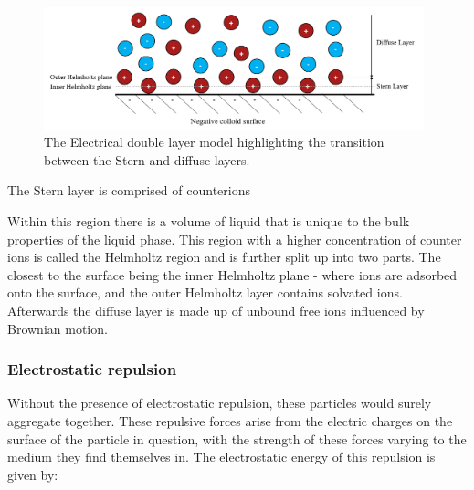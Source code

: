 
\begin{figure}[h]     %
        \begin{center}
          \includegraphics[width=110mm]{chapter1/SternLayer.PNG}
\end{center}
\caption{The Electrical double layer model highlighting the transition between the Stern and diffuse layers.}
\label{fig:Stern}                 %
\end{figure}

The Stern layer is comprised of counterions 

Within this region there is a volume of liquid that is unique to the bulk properties of the liquid phase. This region with a higher concentration of counter ions is called the Helmholtz region and is further split up into two parts. The closest to the surface being the inner Helmholtz plane - where ions are adsorbed onto the surface, and the outer Helmholtz layer contains solvated ions. Afterwards the diffuse layer is made up of unbound free ions influenced by Brownian motion.

\subsubsection{Electrostatic repulsion}


Without the presence of electrostatic repulsion, these particles would surely aggregate together. These repulsive forces arise from the electric charges on the surface of the particle in question, with the strength of these forces varying to the medium they find themselves in.\cite{?} The electrostatic energy of this repulsion is given by:

